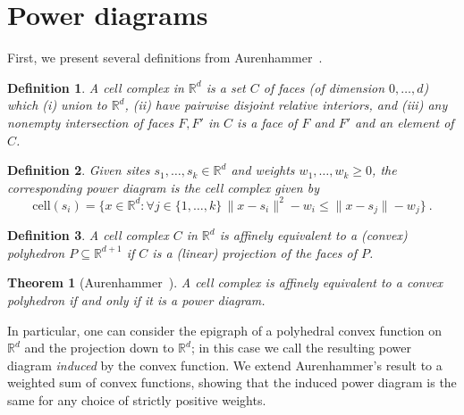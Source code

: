\documentclass[12pt]{article}
\newcommand{\reals}{\mathbb{R}}
\newcommand{\cell}{\mathrm{cell}}
\newtheorem{theorem}{Theorem}
\newtheorem{definition}{Definition}
\begin{document}
\appendix

\newpage
\section{Power diagrams}
First, we present several definitions from Aurenhammer~\cite{aurenhammer1987power}.
\begin{definition}\label{def:cell-complex}
  A \emph{cell complex} in $\reals^d$ is a set $C$ of faces (of dimension $0,\ldots,d$) which (i) union to $\reals^d$, (ii) have pairwise disjoint relative interiors, and (iii) any nonempty intersection of faces $F,F'$ in $C$ is a face of $F$ and $F'$ and an element of $C$.
\end{definition}

\begin{definition}\label{def:power-diagram}
  Given sites $s_1,\ldots,s_k\in\reals^d$ and weights $w_1,\ldots,w_k \geq 0$, the corresponding \emph{power diagram} is the cell complex given by
  \begin{equation}
    \label{eq:pd}
    \cell(s_i) = \{ x \in\reals^d : \forall j \in \{1,\ldots,k\} \, \|x - s_i\|^2 - w_i \leq \|x - s_j\| - w_j\}~.
  \end{equation}
\end{definition}

\begin{definition}\label{def:affine-equiv}
  A cell complex $C$ in $\reals^d$ is \emph{affinely equivalent} to a (convex) polyhedron $P \subseteq \reals^{d+1}$ if $C$ is a (linear) projection of the faces of $P$.
\end{definition}

\begin{theorem}[Aurenhammer~\cite{aurenhammer1987power}]\label{thm:aurenhammer}
  A cell complex is affinely equivalent to a convex polyhedron if and only if it is a power diagram.
\end{theorem}

In particular, one can consider the epigraph of a polyhedral convex function on $\reals^d$ and the projection down to $\reals^d$; in this case we call the resulting power diagram \emph{induced} by the convex function.
We extend Aurenhammer's result to a weighted sum of convex functions, showing that the induced power diagram is the same for any choice of strictly positive weights.
\end{document}
